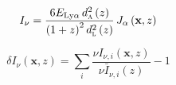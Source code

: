 \begin{equation}
  I_{\nu} = \frac{6 E_{\text{Ly}\alpha}\, d_\textsc{a}^2 \left(z \right)}{\left( 1 + z\right)^2 d_\textsc{l}^2 \left( z \right)}\, J_{\alpha} \left( \textbf{x}, z \right)
\end{equation}


\begin{equation}
  \delta I_{\nu} \left(\textbf{x}, z \right) = \sum_i \frac{\nu I_{\nu, i} \left(\textbf{x}, z \right)}{\nu \bar{I}_{\nu, i} \left(z \right)} - 1
\end{equation}
